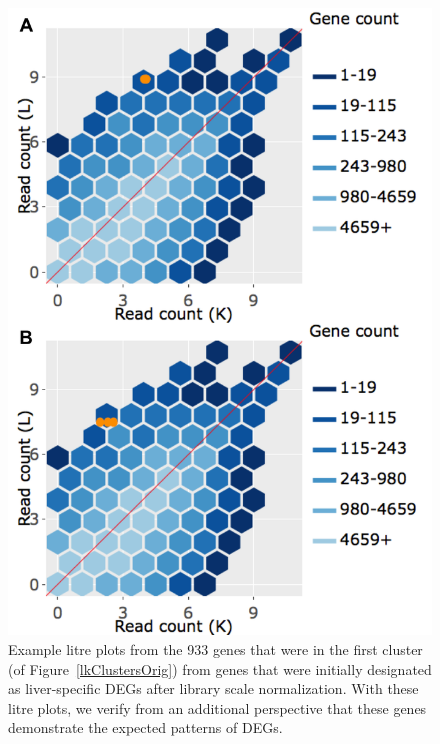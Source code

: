 \documentclass{article}
\begin{document}
\null
\begin{figure}[t!]
\centerline{\includegraphics[width=0.7\columnwidth]{../MakeFigures/Dashboards/litreClusterOrig/litreClusterOrig.jpg}}
\caption{Example litre plots from the 933 genes that were in the first cluster (of Figure~\ref{lkClustersOrig}) from genes that were initially designated as liver-specific DEGs after library scale normalization. With these litre plots, we verify from an additional perspective that these genes demonstrate the expected patterns of DEGs.
\label{litreClusterOrig}}
\end{figure}
\end{document}
